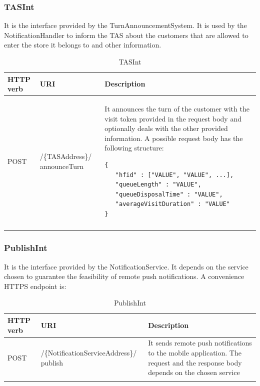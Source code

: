 \documentclass[a4paper,oneside,11pt]{book}
\begin{document}
    \subsubsection{TASInt}
    It is the interface provided by the TurnAnnouncementSystem. It is used by the NotificationHandler to inform the TAS about the customers that are allowed to enter the store it belongs to and other information.
    \begin{longtable}[c] { |>{\centering\arraybackslash}H{0.11\textwidth}|>{\centering\arraybackslash\ttfamily}P{0.23\textwidth}|H{0.50\textwidth}| }
        \hline
        \textbf{HTTP verb} & \textrm{\textbf{URI}} & \textbf{\textbf{Description}} \\ \hline
        POST & /\{TASAddress\}/ announceTurn & It announces the turn of the customer with the visit token provided in the request body and optionally deals with the other provided information. A possible request body has the following structure:
        \begin{lstlisting}[language=jsonDD]
{
   "hfid" : ["VALUE", "VALUE", ...],
   "queueLength" : "VALUE",
   "queueDisposalTime" : "VALUE",
   "averageVisitDuration" : "VALUE" 
}
        \end{lstlisting}  \\ \hline
        \caption{TASInt}
        \label{table:tas_int}
    \end{longtable} 
    
    \newpage
    \subsubsection{PublishInt}
    It is the interface provided by the NotificationService. It depends on the service chosen to guarantee the feasibility of remote push notifications. A convenience HTTPS endpoint is:
    \begin{longtable}[c] { |>{\centering\arraybackslash}H{0.11\textwidth}|>{\centering\arraybackslash\ttfamily}P{0.41\textwidth}|H{0.32\textwidth}| }
        \hline
        \textbf{HTTP verb} & \textrm{\textbf{URI}} & \textbf{\textbf{Description}} \\ \hline
        POST & /\{NotificationServiceAddress\}/ publish & It sends remote push notifications to the mobile application. The request and the response body depends on the chosen service \\ \hline
        \caption{PublishInt}
        \label{table:publish_int}
    \end{longtable} 
    
\end{document}

